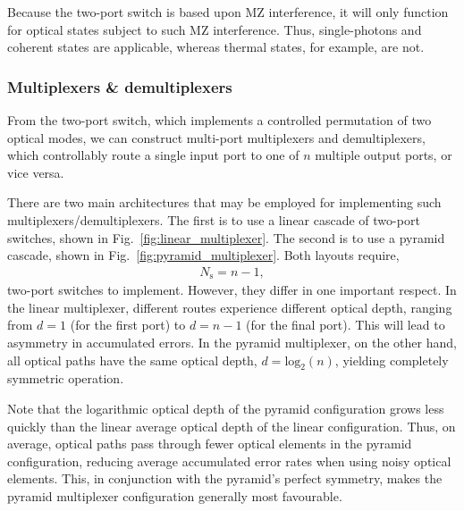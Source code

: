 \documentclass[aps, rmp, twocolumn, amsmath, amssymb, nofootinbib, superscriptaddress, longbibliography, floatfix, table-of-contents, eqsecnum]{revtex4-1}
\begin{document}
Because the two-port switch is based upon MZ interference, it will only function for optical states subject to such MZ interference. Thus, single-photons and coherent states are applicable, whereas thermal states, for example, are not.

%
%

\subsubsection{Multiplexers \& demultiplexers} 

From the two-port switch, which implements a controlled permutation of two optical modes, we can construct multi-port multiplexers and demultiplexers, which controllably route a single input port to one of $n$ multiple output ports, or vice versa.

There are two main architectures that may be employed for implementing such multiplexers/demultiplexers. The first is to use a linear cascade of two-port switches, shown in Fig.~\ref{fig:linear_multiplexer}. The second is to use a pyramid cascade, shown in Fig.~\ref{fig:pyramid_multiplexer}. Both layouts require,
\begin{align}
N_\text{s} = n-1,
\end{align}
two-port switches to implement. However, they differ in one important respect. In the linear multiplexer, different routes experience different optical depth, ranging from \mbox{$d=1$} (for the first port) to \mbox{$d=n-1$} (for the final port). This will lead to asymmetry in accumulated errors. In the pyramid multiplexer, on the other hand, all optical paths have the same optical depth, \mbox{$d=\text{log}_2(n)$}, yielding completely symmetric operation.

Note that the logarithmic optical depth of the pyramid configuration grows less quickly than the linear average optical depth of the linear configuration. Thus, on average, optical paths pass through fewer optical elements in the pyramid configuration, reducing average accumulated error rates when using noisy optical elements. This, in conjunction with the pyramid's perfect symmetry, makes the pyramid multiplexer configuration generally most favourable.
\end{document}
